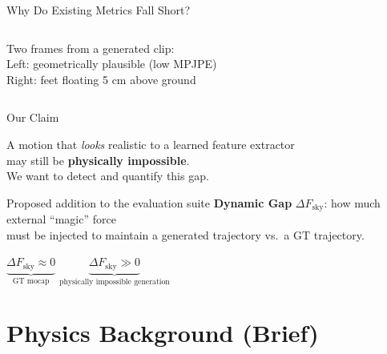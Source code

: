\documentclass[aspectratio=169, 10pt]{beamer}
\newcommand{\highlight}[1]{\textcolor{physblue}{\textbf{#1}}}
\begin{document}
\begin{frame}{Why Do Existing Metrics Fall Short?}
\begin{columns}[T]
      \vspace{0.5em}
      \begin{tcolorbox}[colback=lightyellow, colframe=notegray,
                        title={\small [IMG]Suggested figure}]
        \small Two frames from a generated clip:\\
        Left: geometrically plausible (low MPJPE)\\
        Right: feet floating 5 cm above ground
      \end{tcolorbox}
  \end{columns}
\end{frame}


\begin{frame}{Our Claim}
  \begin{center}
    \Large
    A motion that \emph{looks} realistic to a learned feature extractor\\[0.4em]
    may still be \highlight{physically impossible}.\\[1em]
    \normalsize
    We want to detect and quantify this gap.
  \end{center}

  \vspace{1em}
  \begin{block}{Proposed addition to the evaluation suite}
    \textbf{Dynamic Gap} $\Delta F_\text{sky}$: how much external ``magic'' force\\
    must be injected to maintain a generated trajectory vs.\ a GT trajectory.
  \end{block}

  \vspace{0.5em}
  \begin{center}
    $\underbrace{\Delta F_\text{sky} \approx 0}_{\text{GT mocap}}$
    \hspace{3em}
    $\underbrace{\Delta F_\text{sky} \gg 0}_{\text{physically impossible generation}}$
  \end{center}
\end{frame}

\section{Physics Background (Brief)}
\end{document}
